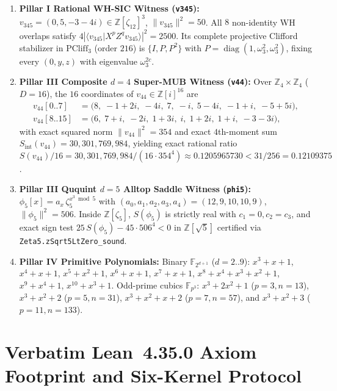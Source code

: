 \documentclass[11pt,letterpaper]{article}
\theoremstyle{plain}
\theoremstyle{definition}
\theoremstyle{remark}
\newcommand{\F}{\mathbb{F}}
\newcommand{\Z}{\mathbb{Z}}
\newcommand{\PCliff}{\mathrm{PCliff}}
\newcommand{\braket}[2]{\langle #1 \vert #2 \rangle}
\newcommand{\norm}[1]{\lVert #1 \rVert}
\newcommand{\leanref}[1]{\textnormal{\texttt{\footnotesize #1}}}
\begin{document}
\begin{enumerate}[leftmargin=2em,itemsep=4pt]
  \item \textbf{Pillar I Rational WH-SIC Witness (\texttt{v345}):}
  $v_{345}=(0, 5, -3-4i)\in\Z[\zeta_{12}]^3$, $\norm{v_{345}}^2=50$. All $8$ non-identity WH overlaps satisfy $4|\braket{v_{345}}{X^p Z^q v_{345}}|^2=2500$. Its complete projective Clifford stabilizer in $\PCliff_3$ (order $216$) is $\{I, P, P^2\}$ with $P=\operatorname{diag}(1,\omega_3^2,\omega_3^2)$, fixing every $(0,y,z)$ with eigenvalue $\omega_3^{2c}$.
  \item \textbf{Pillar III Composite $d=4$ Super-MUB Witness (\texttt{v44}):}
  Over $\Z_4\times\Z_4$ ($D=16$), the $16$ coordinates of $v_{44}\in\Z[i]^{16}$ are
  \begin{align*}
    v_{44}[0..7]  &= \bigl(8,\; -1+2i,\; -4i,\; 7,\; -i,\; 5-4i,\; -1+i,\; -5+5i\bigr),\\
    v_{44}[8..15] &= \bigl(6,\; 7+i,\; -2i,\; 1+3i,\; i,\; 1+2i,\; 1+i,\; -3-3i\bigr),
  \end{align*}
  with exact squared norm $\norm{v_{44}}^2=354$ and exact $4$th-moment sum $S_{\mathrm{int}}(v_{44})=30{,}301{,}769{,}984$, yielding exact rational ratio $S(v_{44})/16 = 30{,}301{,}769{,}984 / (16\cdot 354^4) \approx 0.1205965730 < 31/256 = 0.12109375$.
  \item \textbf{Pillar III Ququint $d=5$ Alltop Saddle Witness (\texttt{phi5}):}
  $\phi_5[x]=a_x\,\zeta_5^{x^3\bmod 5}$ with $(a_0,a_1,a_2,a_3,a_4)=(12,9,10,10,9)$, $\norm{\phi_5}^2=506$. Inside $\Z[\zeta_5]$, $S(\phi_5)$ is strictly real with $c_1=0, c_2=c_3$, and exact sign test $25\,S(\phi_5) - 45\cdot 506^4 < 0$ in $\Z[\sqrt{5}]$ certified via \leanref{Zeta5.zSqrt5LtZero\_sound}.
  \item \textbf{Pillar IV Primitive Polynomials:}
  Binary $\F_{2^{d+1}}$ ($d=2..9$): $x^3+x+1$, $x^4+x+1$, $x^5+x^2+1$, $x^6+x+1$, $x^7+x+1$, $x^8+x^4+x^3+x^2+1$, $x^9+x^4+1$, $x^{10}+x^3+1$.
  Odd-prime cubics $\F_{p^3}$: $x^3+2x^2+1$ ($p=3,n=13$), $x^3+x^2+2$ ($p=5,n=31$), $x^3+x^2+x+2$ ($p=7,n=57$), and $x^3+x^2+3$ ($p=11,n=133$).
\end{enumerate}

\section{Verbatim Lean~4.35.0 Axiom Footprint and Six-Kernel Protocol}
\label{app:axioms}
\end{document}

